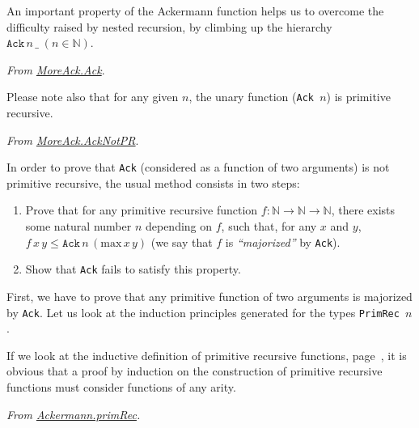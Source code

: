 An important property of the Ackermann function helps us 
to overcome the difficulty raised by nested recursion, by climbing up the hierarchy $\texttt{Ack}\,n\,\_\;(n\in\mathbb{N})$.


\noindent
\emph{From \href{../theories/html/hydras.MoreAck.Ack.html}{MoreAck.Ack}}.




\label{sect:AcknPR}

Please note also that for any given $n$, the unary function
(\texttt{Ack\,$n$}) is primitive recursive.

\vspace{4pt}

\noindent

\emph{From \href{../theories/html/hydras.MoreAck.AckNotPR.html}{MoreAck.AckNotPR}}.





In order to prove that \texttt{Ack} (considered as a function of two arguments) is not primitive recursive, the usual method consists in two steps:


\begin{enumerate}
\item Prove that for any primitive recursive function $f:\mathbb{N}\rightarrow\mathbb{N}\rightarrow\mathbb{N}$, there exists some natural number $n$ depending on $f$, such that, for any $x$ and $y$, 
$f\,x\,y \leq \texttt{Ack}\,n\,(\textrm{max}\,x\,y)$ (we say that $f$ is \emph{``majorized''}  by \texttt{Ack}).
\item Show that \texttt{Ack} fails to satisfy this property.
\end{enumerate}

First, we have to prove that any primitive function of two arguments is majorized by \texttt{Ack}.
Let us look at the induction principles generated for the types
\texttt{PrimRec $n$}. %

If we look at the inductive definition of primitive recursive functions, page~\pageref{def:Primrec}, it is obvious that a proof by induction on the construction of primitive recursive functions must consider functions of any arity.



\vspace{4pt}
\noindent
\emph{From \href{../theories/html/hydras.Ackermann.primRec.html}{Ackermann.primRec}.}


